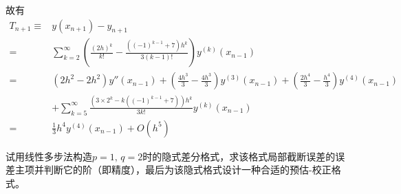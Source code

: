 \documentclass[11pt]{article}
\begin{document}
\begin{question}
{        %
        故有
        \begin{align*}
            T_{n + 1} \equiv & y(x_{n + 1}) - y_{n + 1}                                                                                                                                                \\
            =                & \sum_{k = 2}^{\infty}\left(\frac{(2h)^k}{k!} - \frac{\left((-1)^{k - 1} + 7\right)h^k}{3(k - 1)!}\right)y^{(k)}(x_{n - 1})                                              \\
            =                & \left(2h^2 - 2h^2\right)y''(x_{n - 1}) + \left(\frac{4h^3}{3} - \frac{4h^3}{3}\right)y^{(3)}(x_{n - 1}) + \left(\frac{2h^4}{3} - \frac{h^4}{3}\right)y^{(4)}(x_{n - 1}) \\
                             & + \sum_{k = 5}^{\infty}\frac{\left(3 \times 2^k - k\left((-1)^{k - 1} + 7\right)\right)h^k}{3k!}y^{(k)}(x_{n - 1})                                                      \\
            =                & \frac{1}{3}h^4y^{(4)}(x_{n - 1}) + O(h^5)
        \end{align*}
    }
\end{question}

\begin{question}
    \questiontext
    {
        试用线性多步法构造$p = 1,\, q = 2$时的隐式差分格式，求该格式局部截断误差的误差主项并判断它的阶（即精度），最后为该隐式格式设计一种合适的预估-校正格式。
    }
    \answer
    {

    }
\end{question}
\end{document}
